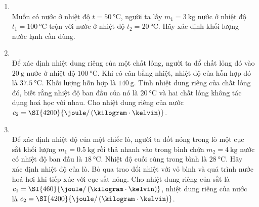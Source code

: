 \begin{enumerate}[label=\bfseries Câu \arabic*:, leftmargin=1.7cm]
\item {}\\
Muốn có nước ở nhiệt độ $t = \SI{50}{\celsius}$, người ta lấy $m_1 = \SI{3}{\kilogram}$ nước ở nhiệt độ $t_1 = \SI{100}{\celsius}$ trộn với nước ở nhiệt độ $t_2 =\SI{20}{\celsius}$. Hãy xác định khối lượng nước lạnh cần dùng. 

	\item {}\\
	Để xác định nhiệt dung riêng của một chất lỏng, người ta đổ chất lỏng đó vào $\SI{20}{\gram}$ nước ở nhiệt độ $\SI{100}{\celsius}$. Khi có cân bằng nhiệt, nhiệt độ của hỗn hợp đó là $\SI{37.5}{\celsius}$. Khối lượng hỗn hợp là $\SI{140}{\gram}$. Tính nhiệt dung riêng của chất lỏng đó, biết rằng nhiệt độ ban đầu của nó là $\SI{20}{\celsius}$ và hai chất lỏng không tác dụng hoá học với nhau. Cho nhiệt dung riêng của nước $c_2=\SI{4200}{\joule/\left(\kilogram\cdot\kelvin\right)}$. 

\item {}\\
Để xác định nhiệt độ của một chiếc lò, người ta đốt nóng trong lò một cục sắt khối lượng $m_1=\SI{0.5}{\kilogram}$ rồi thả nhanh vào trong bình chứa $m_2=\SI{4}{\kilogram}$ nước có nhiệt độ ban đầu là $\SI{18}{\celsius}$. Nhiệt độ cuối cùng trong bình là $\SI{28}{\celsius}$. Hãy xác định nhiệt độ của lò. Bỏ qua trao đổi nhiệt với vỏ bình và quá trình nước hoá hơi khi tiếp xúc với cục sắt nóng. Cho nhiệt dung riêng của sắt là $c_1=\SI{460}{\joule/\left(\kilogram\cdot\kelvin\right)}$, nhiệt dung riêng của nước là $c_2=\SI{4200}{\joule/\left(\kilogram\cdot\kelvin\right)}$.


\end{enumerate}
